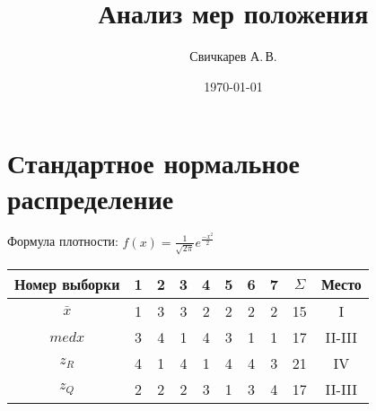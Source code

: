 \documentclass{article} %
\title{Анализ мер положения} %
\author{Свичкарев А.\,В.} %
\date{\today} %
\begin{document}

\maketitle %

\section{Стандартное нормальное распределение}

Формула плотности:
\( f(x) = \frac{1}{\sqrt{ 2\pi }}e^{\frac{-x^2}{2}} \)

\begin{center}
	\begin{tabular}{|c| c|c|c|c|c|c|c| c|c|} \hline
		Номер выборки & 1 & 2 & 3 & 4 & 5 & 6 & 7 & \(\Sigma\) & Место \\ \hline
		\(\bar{x}\) & 1 & 3 & 3 & 2 & 2 & 2 & 2 & 15 & I \\ \hline
		\(medx\) & 3 & 4 & 1 & 4 & 3 & 1 & 1 & 17 & II-III \\ \hline
		\(z_R\) & 4 & 1 & 4 & 1 & 4 & 4 & 3 & 21 & IV \\ \hline
		\(z_Q\) & 2 & 2 & 2 & 3 & 1 & 3 & 4 & 17 & II-III \\ \hline
	\end{tabular}
\end{center}
\end{document}
